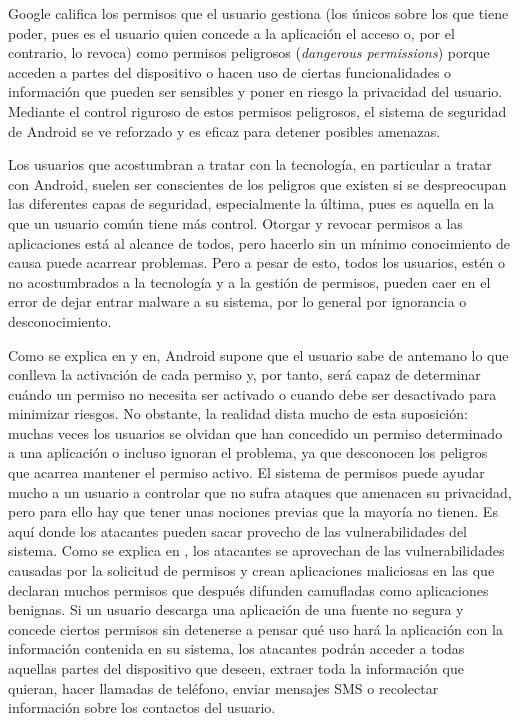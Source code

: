Google califica los permisos que el usuario gestiona (los únicos sobre los que tiene poder, pues es el usuario quien concede a la aplicación el acceso o, por el contrario, lo revoca) como permisos peligrosos (\textit{dangerous permissions}) porque acceden a partes del dispositivo o hacen uso de ciertas funcionalidades o información que pueden ser sensibles y poner en riesgo la privacidad del usuario. Mediante el control riguroso de estos permisos peligrosos, el sistema de seguridad de Android se ve reforzado y es eficaz para detener posibles amenazas.

Los usuarios que acostumbran a tratar con la tecnología, en particular a tratar con Android, suelen ser conscientes de los peligros que existen si se despreocupan las diferentes capas de seguridad, especialmente la última, pues es aquella en la que un usuario común tiene más control. Otorgar y revocar permisos a las aplicaciones está al alcance de todos, pero hacerlo sin un mínimo conocimiento de causa puede acarrear problemas. Pero a pesar de esto, todos los usuarios, estén o no acostumbrados a la tecnología y a la gestión de permisos, pueden caer en el error de dejar entrar malware a su sistema, por lo general por ignorancia o desconocimiento.

Como se explica en \hypersetup{citecolor=red}\cite{porter} y en\hypersetup{citecolor=red}\cite{khantoon}, Android supone que el usuario sabe de antemano lo que conlleva la activación de cada permiso y, por tanto, será capaz de determinar cuándo un permiso no necesita ser activado o cuando debe ser desactivado para minimizar riesgos. No obstante, la realidad dista mucho de esta suposición: muchas veces los usuarios se olvidan que han concedido un permiso determinado a una aplicación o incluso ignoran el problema, ya que desconocen los peligros que acarrea mantener el permiso activo. El sistema de permisos puede ayudar mucho a un usuario a controlar que no sufra ataques que amenacen su privacidad, pero para ello hay que tener unas nociones previas que la mayoría no tienen. Es aquí donde los atacantes pueden sacar provecho de las vulnerabilidades del sistema. Como se explica en \hypersetup{citecolor=red}\cite{bassole}, los atacantes se aprovechan de las vulnerabilidades causadas por la solicitud de permisos y crean aplicaciones maliciosas en las que declaran muchos permisos\hypersetup{citecolor=red}\cite{attandck} que después difunden camufladas como aplicaciones benignas. Si un usuario descarga una aplicación de una fuente no segura y concede ciertos permisos sin detenerse a pensar qué uso hará la aplicación con la información contenida en su sistema, los atacantes podrán acceder a todas aquellas partes del dispositivo que deseen, extraer toda la información que quieran, hacer llamadas de teléfono, enviar mensajes SMS o recolectar información sobre los contactos del usuario.

